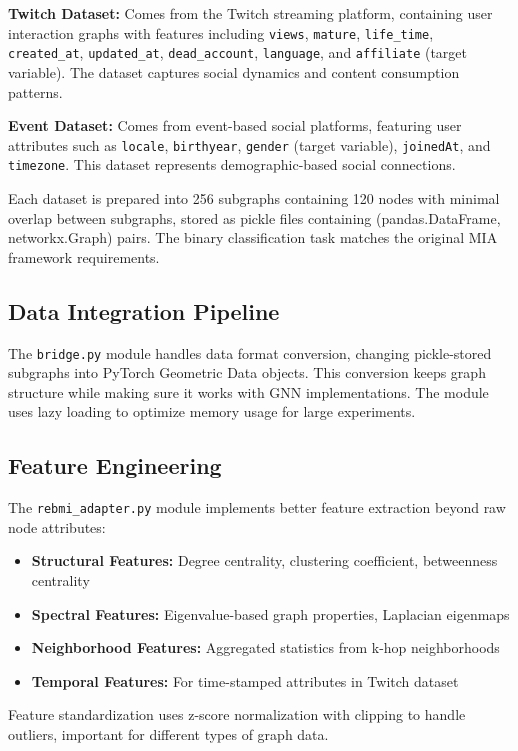 \documentclass{article}
\begin{document}
\textbf{Twitch Dataset:} Comes from the Twitch streaming platform, containing user interaction graphs with features including \texttt{views}, \texttt{mature}, \texttt{life\_time}, \texttt{created\_at}, \texttt{updated\_at}, \texttt{dead\_account}, \texttt{language}, and \texttt{affiliate} (target variable). The dataset captures social dynamics and content consumption patterns.

\textbf{Event Dataset:} Comes from event-based social platforms, featuring user attributes such as \texttt{locale}, \texttt{birthyear}, \texttt{gender} (target variable), \texttt{joinedAt}, and \texttt{timezone}. This dataset represents demographic-based social connections.

Each dataset is prepared into 256 subgraphs containing 120 nodes with minimal overlap between subgraphs, stored as pickle files containing (pandas.DataFrame, networkx.Graph) pairs. The binary classification task matches the original MIA framework requirements.

\subsection{Data Integration Pipeline}
The \texttt{bridge.py} module handles data format conversion, changing pickle-stored subgraphs into PyTorch Geometric Data objects. This conversion keeps graph structure while making sure it works with GNN implementations. The module uses lazy loading to optimize memory usage for large experiments.

\subsection{Feature Engineering}
The \texttt{rebmi\_adapter.py} module implements better feature extraction beyond raw node attributes:

\begin{itemize}
\item \textbf{Structural Features:} Degree centrality, clustering coefficient, betweenness centrality
\item \textbf{Spectral Features:} Eigenvalue-based graph properties, Laplacian eigenmaps
\item \textbf{Neighborhood Features:} Aggregated statistics from k-hop neighborhoods
\item \textbf{Temporal Features:} For time-stamped attributes in Twitch dataset
\end{itemize}

Feature standardization uses z-score normalization with clipping to handle outliers, important for different types of graph data.
\end{document}
